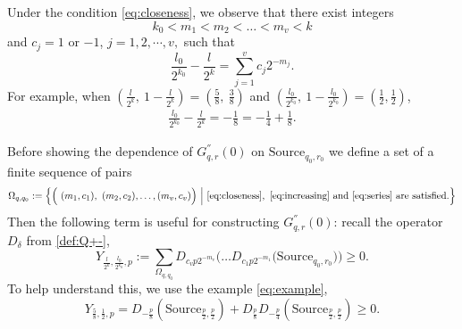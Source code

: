 \documentclass{article}
\numberwithin{equation}{section}
\begin{document}
Under the condition \eqref{eq:closeness}, we observe that there exist integers
\begin{equation}\label{eq:increasing}
k_0 < m_1 < m_2 < \dots < m_v < k 
\end{equation}
and $c_j =  1$ or $-1$, $j=1,2,\cdots,v,$ such that
\begin{equation}\label{eq:series}
\frac{l_0}{2^{k_0}} - \frac{l}{2^k} = \sum_{j=1}^{v} c_j 2^{-m_j}. 
\end{equation}
For example, when $(\frac{l}{2^{k}},\ 1-\frac{l}{2^{k}})=(\frac{5}{8},\ \frac{3}{8})$ and $(\frac{l_0}{2^{k_0}},\ 1-\frac{l_0}{2^{k_0}})=(\frac{1}{2},\frac{1}{2})$,
\begin{align}\label{eq:example}
\frac{l_0}{2^{k_0}}-\frac{l}{2^{k}}=-\frac{1}{8}=-\frac{1}{4}+\frac{1}{8}.
\end{align}


Before showing the dependence of $G^{''}_{q,r}(0)$ on $\text{Source}_{q_0,r_0}$ we define a set of a finite sequence of pairs
$$\Omega_{q,q_0} := \Big\{ \Big(\ (m_1,c_1),\ (m_2,c_2), \dots, (m_v,c_v)\Big)\ \Big|\ \eqref{eq:closeness},\ \eqref{eq:increasing} \text{ and } \eqref{eq:series} \text{ are satisfied} .\Big\}$$
Then the following term is useful for constructing $G_{q, r}^{''}(0)$: recall the operator $D_{\delta}$ from \eqref{def:Q+-},
$$Y_{  \frac{l}{2^k}, \frac{l_0}{2^{k_0}}, p}:=\sum_{\Omega_{q,  q_0 }}  D_{c_v p 2^{-m_v}}\Big( \dots D_{c_1 p 2^{-m_1}} \big( \text{Source}_{ q_0,r_0 }  \big)\Big)\geq 0.$$
To help understand this, we use the example \eqref{eq:example},
\begin{equation}\label{eq:exampleIter}
Y_{\frac{5}{8},\frac{1}{2},p}=D_{-\frac{p}{8}} (\text{Source}_{\frac{p}{2},\frac{p}{2}})+D_{\frac{p}{8}}D_{-\frac{p}{4}}(\text{Source}_{\frac{p}{2},\frac{p}{2}})\geq 0.
\end{equation}
\end{document}
